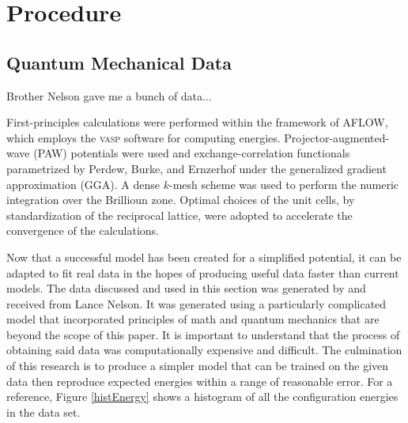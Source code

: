 \section{Procedure} \label{Sect:procedure}
\subsection{Quantum Mechanical Data}\label{Sect:procedureData}
%
%
%
%
%
%
%
%
\par Brother Nelson gave me a bunch of data...
\par First-principles calculations were performed within the framework of AFLOW,\cite{monster,curtarolo:art13,curtarolo:art49,curtarolo:art53,curtarolo:art51,curtarolo:art56,curtarolo:art58,curtarolo:art64} which employs the \textsc{vasp} software for computing energies.\cite{kresse1993abinitio} Projector-augmented-wave (PAW) potentials were used and exchange-correlation functionals parametrized by Perdew, Burke, and Ernzerhof under the generalized gradient approximation (GGA)\cite{Kresse:1999wc,kresse1996efficiency,Blochl:1994dx}. A dense $k$-mesh scheme was used to perform the numeric integration over the Brillioun zone\cite{monkhorst1976special}. Optimal choices of the unit cells, by standardization of the reciprocal lattice, were adopted to accelerate the convergence of the calculations.\cite{curtarolo:art58,curtarolo:art64}
\par Now that a successful model has been created for a simplified potential, it can be adapted to fit real data in the hopes of producing useful data faster than current models. The data discussed and used in this section was generated by and received from Lance Nelson. It was generated using a particularly complicated model that incorporated principles of math and quantum mechanics that are beyond the scope of this paper. It is important to understand that the process of obtaining said data was computationally expensive and difficult. The culmination of this research is to produce a simpler model that can be trained on the given data then reproduce expected energies within a range of reasonable error. For a reference, Figure \ref{histEnergy} shows a histogram of all the configuration energies in the data set.

